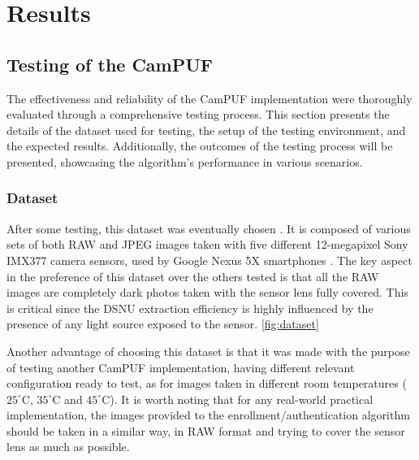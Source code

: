 \chapter{Results}\label{sec:results}

\section{Testing of the CamPUF}
The effectiveness and reliability of the CamPUF implementation were thoroughly evaluated through a comprehensive testing process. This section presents the details of the dataset used for testing, the setup of the testing environment, and the expected results. Additionally, the outcomes of the testing process will be presented, showcasing the algorithm's performance in various scenarios.

\subsection{Dataset}\label{sec:dataset}
After some testing, this dataset was eventually chosen \cite{dataset_url}. It is composed of various sets of both RAW and JPEG images taken with five different 12-megapixel Sony IMX377 camera sensors, used by Google Nexus 5X smartphones \cite{dataset_explaination}. The key aspect in the preference of this dataset over the others tested is that all the RAW images are completely dark photos taken with the sensor lens fully covered. This is critical since the DSNU extraction efficiency is highly influenced by the presence of any light source exposed to the sensor. \ref{fig:dataset}

Another advantage of choosing this dataset is that it was made with the purpose of testing another CamPUF implementation, having different relevant configuration ready to test, as for images taken in different room temperatures ($25^{\circ}$C, $35^{\circ}$C and $45^{\circ}$C). It is worth noting that for any real-world practical implementation, the images provided to the enrollment/authentication algorithm should be taken in a similar way, in RAW format and trying to cover the sensor lens as much as possible.

